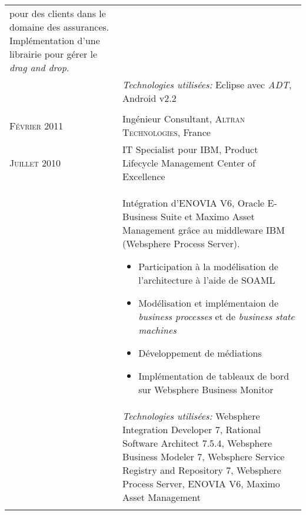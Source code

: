 \begin{longtable}{R{2.5cm}|p{14.8cm}}
{	pour des clients dans le domaine des assurances. Implémentation d'une librairie pour gérer le \emph{drag and drop}.}                                                \\&
	\footnotesize{\emph{Technologies utilisées:} Eclipse avec \emph{ADT}, Android v2.2 }                                                                                \\
	                                                                                                                                                \\
	\textsc{Février 2011}   & Ingénieur Consultant, \textsc{Altran Technologies}, France                                                                                \\
	\textsc{Juillet 2010}   & IT Specialist pour IBM, Product Lifecycle Management Center of Excellence                                                                 \\&
	\footnotesize{
		Intégration d'ENOVIA V6, Oracle E-Business Suite et Maximo Asset Management grâce au middleware IBM (Websphere Process Server).
		\begin{itemize}
			\item Participation à la modélisation de l'architecture à l'aide de SOAML
			\item Modélisation et implémentaion de \emph{business processes} et de \emph{business state machines}
			\item Développement de médiations
			\item Implémentation de tableaux de bord sur Websphere Business Monitor
		\end{itemize}
		\vspace{-1em}
	}                                                                                                                                                                   \\&
	\footnotesize{\emph{Technologies utilisées:} Websphere Integration Developer 7, Rational Software Architect 7.5.4, Websphere Business Modeler 7, Websphere Service Registry and Repository 7,
	Websphere Process Server, ENOVIA V6, Maximo Asset Management }                                                                                                      \\
	                                                                                                                                                \\

\end{longtable}
